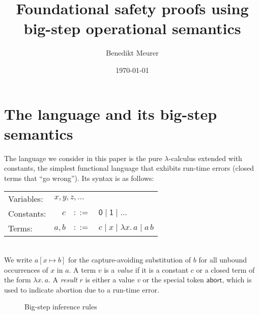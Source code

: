 \documentclass[12pt,a4paper]{article}
\theoremstyle{definition}
\theoremstyle{plain}
\newcommand{\abort}{\ensuremath{\mathsf{abort}}}
\newcommand{\abstr}[2]{\ensuremath{\lambda{#1}.\,{#2}}}
\newcommand{\app}[2]{\ensuremath{{#1}\,{#2}}}
\begin{document}
\author{Benedikt Meurer}
\date{\today}
\title{Foundational safety proofs using\\big-step operational semantics}
\maketitle


\section{The language and its big-step semantics}
\label{sec:The_language_and_its_big_step_semantics}

The language we consider in this paper is the pure $\lambda$-calculus extended with constants,
the simplest functional language that exhibits run-time errors (closed terms that ``go
wrong''). Its syntax is as follows: \\[3mm]
\begin{tabular}{lrcl}
  Variables: & \multicolumn{3}{l}{$x,y,z,\ldots$} \\
  Constants: & $c$ & $::=$ & $\mathsf{0} \mid \mathsf{1} \mid \ldots$ \\
  Terms: & $a,b$ & $::=$ & $c \mid x \mid \abstr{x}{a} \mid \app{a}{b}$ \\
\end{tabular} \\[3mm]
We write $a[x \mapsto b]$ for the capture-avoiding substitution of $b$ for all unbound occurrences
of $x$ in $a$. A term $v$ is a \emph{value} if it is a constant $c$ or a closed term of the form
$\abstr{x}{a}$. A \emph{result} $r$ is either a value $v$ or the special token $\abort$, which is
used to indicate abortion due to a run-time error.

\begin{figure}[htb]
  \centering
  \caption{Big-step inference rules}
  \label{fig:Big_step_inference_rules}
\end{figure}
\end{document}
